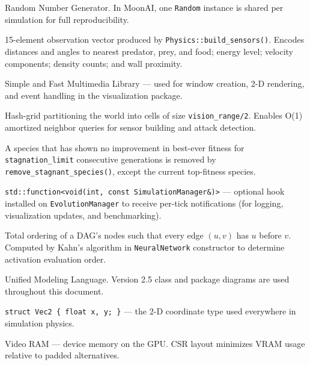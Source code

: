 \begin{description}[style=nextline,leftmargin=4.5cm,font=\ttfamily\bfseries]
  \item[RNG]
    Random Number Generator.  In MoonAI, one \texttt{Random} instance is shared per
    simulation for full reproducibility.

  \item[SensorInput]
    15-element observation vector produced by \texttt{Physics::build\_sensors()}.
    Encodes distances and angles to nearest predator, prey, and food; energy level;
    velocity components; density counts; and wall proximity.

  \item[SFML]
    Simple and Fast Multimedia Library — used for window creation, 2-D rendering, and
    event handling in the visualization package.

  \item[SpatialGrid]
    Hash-grid partitioning the world into cells of size \texttt{vision\_range/2}.
    Enables O(1) amortized neighbor queries for sensor building and attack detection.

  \item[Species stagnation]
    A species that has shown no improvement in best-ever fitness for
    \texttt{stagnation\_limit} consecutive generations is removed by
    \texttt{remove\_stagnant\_species()}, except the current top-fitness species.

  \item[TickCallback]
    \texttt{std::function<void(int, const SimulationManager\&)>} — optional hook
    installed on \texttt{EvolutionManager} to receive per-tick notifications
    (for logging, visualization updates, and benchmarking).

  \item[Topological sort]
    Total ordering of a DAG's nodes such that every edge $(u,v)$ has $u$ before $v$.
    Computed by Kahn's algorithm in \texttt{NeuralNetwork} constructor to determine
    activation evaluation order.

  \item[UML]
    Unified Modeling Language.  Version 2.5 class and package diagrams are used
    throughout this document.

  \item[Vec2]
    \texttt{struct Vec2 \{ float x, y; \}} — the 2-D coordinate type used everywhere in
    simulation physics.

  \item[VRAM]
    Video RAM — device memory on the GPU.  CSR layout minimizes VRAM usage relative to
    padded alternatives.

\end{description}
